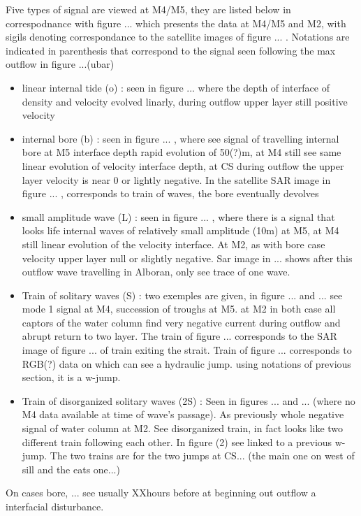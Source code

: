 Five types of signal are viewed at M4/M5, they are listed below in correspodnance with figure ... which presents the data at M4/M5 and M2, with sigils denoting correspondance to the satellite images of figure ... . Notations are indicated in parenthesis that correspond to the signal seen following the max outflow in figure ...(ubar)
\begin{itemize}
\item linear internal tide (o) : seen in figure ... where the depth of interface of density and velocity evolved linarly, during outflow upper layer still positive velocity
\item internal bore (b) : seen in figure ... , where see signal of travelling internal bore at M5 interface depth rapid evolution of 50(?)m, at M4 still see same linear evolution of velocity interface depth, at CS during outflow the upper layer velocity is near 0 or lightly negative. In the satellite SAR image in figure ... , corresponds to train of waves, the bore eventually devolves
\item small amplitude wave (L) : seen in figure ... , where there is a signal that looks life internal waves of relatively small amplitude (10m) at M5, at M4 still linear evolution of the velocity interface. At M2, as with bore case velocity upper layer null or slightly negative. Sar image in ... shows after this outflow wave travelling in Alboran, only see trace of one wave.
\item Train of solitary waves (S) : two exemples are given, in figure ... and ...  see mode 1 signal at M4, succession of troughs at M5. at M2 in both case all captors of the water column find very negative current during outflow and abrupt return to two layer. The train of figure ... corresponds to the SAR image of figure ... of train exiting the strait. Train of figure ... corresponds to RGB(?) data on which can see a hydraulic jump. using notations of previous section, it is a w-jump.
\item Train of disorganized solitary waves (2S) : Seen in figures ... and ... (where no M4 data available at time of wave's passage). As previously whole negative signal of water column at M2. See disorganized train, in fact looks like two different train following each other. In figure (2) see linked to a previous w-jump. The two trains are for the two jumps at CS... (the main one on west of sill and the eats one...)
\end{itemize}

On cases bore, ... see usually XXhours before at beginning out outflow a interfacial disturbance. 

